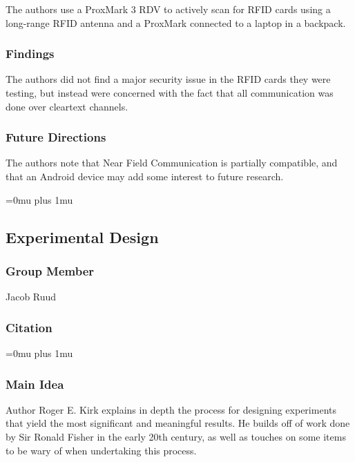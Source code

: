 \noindent
The authors use a ProxMark 3 RDV to actively scan for RFID cards using a long-range RFID antenna and a ProxMark connected to a laptop in a backpack.

\subsubsection{Findings}

\noindent
The authors did not find a major security issue in the RFID cards they were testing, but instead were concerned with the fact that all communication was done over cleartext channels.  

\subsubsection{Future Directions}

\noindent
The authors note that Near Field Communication is partially compatible, and that an Android device may add some interest to future research. 

\Urlmuskip=0mu plus 1mu\relax

\noindent
\subsection{{Experimental} {Design}}

\subsubsection{Group Member}

\noindent
Jacob Ruud

\noindent
\subsubsection{Citation}

\Urlmuskip=0mu plus 1mu\relax

\subsubsection{Main Idea}

\noindent
Author Roger E. Kirk explains in depth the process for designing experiments that yield the most significant and meaningful results. He builds off of work done by Sir Ronald Fisher in the early 20th century, as well as touches on some items to be wary of when undertaking this process.

